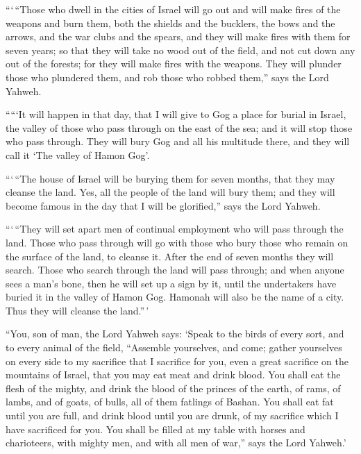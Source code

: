  ```\,``Those who dwell in the cities of Israel will go out
and will make fires of the weapons and burn them, both the shields and
the bucklers, the bows and the arrows, and the war clubs and the spears,
and they will make fires with them for seven years;  so
that they will take no wood out of the field, and not cut down any out
of the forests; for they will make fires with the weapons. They will
plunder those who plundered them, and rob those who robbed them,'' says
the Lord Yahweh.

 `````It will happen in that day, that I will give to Gog a
place for burial in Israel, the valley of those who pass through on the
east of the sea; and it will stop those who pass through. They will bury
Gog and all his multitude there, and they will call it `The valley of
Hamon Gog'.

 ```\,``The house of Israel will be burying them for seven
months, that they may cleanse the land.  Yes, all the
people of the land will bury them; and they will become famous in the
day that I will be glorified,'' says the Lord Yahweh.

 ```\,``They will set apart men of continual employment who
will pass through the land. Those who pass through will go with those
who bury those who remain on the surface of the land, to cleanse it.
After the end of seven months they will search.  Those who
search through the land will pass through; and when anyone sees a man's
bone, then he will set up a sign by it, until the undertakers have
buried it in the valley of Hamon Gog.  Hamonah will also be
the name of a city. Thus they will cleanse the land.''\,'

 ``You, son of man, the Lord Yahweh says: `Speak to the
birds of every sort, and to every animal of the field, ``Assemble
yourselves, and come; gather yourselves on every side to my sacrifice
that I sacrifice for you, even a great sacrifice on the mountains of
Israel, that you may eat meat and drink blood.  You shall
eat the flesh of the mighty, and drink the blood of the princes of the
earth, of rams, of lambs, and of goats, of bulls, all of them fatlings
of Bashan.  You shall eat fat until you are full, and drink
blood until you are drunk, of my sacrifice which I have sacrificed for
you.  You shall be filled at my table with horses and
charioteers, with mighty men, and with all men of war,'' says the Lord
Yahweh.'

